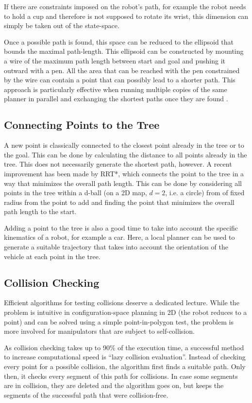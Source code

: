 If there are constraints imposed on the robot's path, for example the robot needs to hold a cup and therefore is not supposed to rotate its wrist, this dimension can simply be taken out of the state-space.

Once a possible path is found, this space can be reduced to the ellipsoid that bounds the maximal path-length. This ellipsoid can be constructed by mounting a wire of the maximum path length between start and goal and pushing it outward with a pen. All the area that can be reached with the pen constrained by the wire can contain a point that can possibly lead to a shorter path. This approach is particularly effective when running multiple copies of the same planner in parallel and exchanging the shortest paths once they are found \cite{otte2012}.

\subsection{Connecting Points to the Tree}
A new point is classically connected to the closest point already in the tree or to the goal. This can be done by calculating the distance to all points already in the tree. This does not necessarily generate the shortest path, however. A recent improvement has been made by RRT*, which connects the point to the tree in a way that minimizes the overall path length. This can be done by considering all points in the tree within a d-ball (on a 2D map, $d=2$, i.e. a circle) from of fixed radius from the point to add and finding the point that minimizes the overall path length to the start.

Adding a point to the tree is also a good time to take into account the specific kinematics of a robot, for example a car. Here, a local planner can be used to generate a suitable trajectory that takes into account the orientation of the vehicle at each point in the tree.

\subsection{Collision Checking}
Efficient algorithms for testing collisions deserve a dedicated lecture. While the problem is intuitive in configuration-space planning in 2D (the robot reduces to a point) and can be solved using a simple point-in-polygon test, the problem is more involved for manipulators that are subject to self-collision.

As collision checking takes up to 90\% of the execution time, a successful method to increase computational speed is ``lazy collision evaluation''. Instead of checking every point for a possible collision, the algorithm first finds a suitable path. Only then, it checks every segment of this path for collisions. In case some segments are in collision, they are deleted and the algorithm goes on, but keeps the segments of the successful path that were collision-free.

